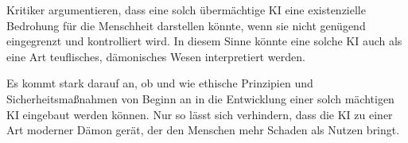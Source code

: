 \documentclass[10pt]{article}
\begin{document}
Kritiker argumentieren, dass eine solch übermächtige KI eine existenzielle Bedrohung für die Menschheit darstellen könnte, wenn sie nicht genügend eingegrenzt und kontrolliert wird. In diesem Sinne könnte eine solche KI auch als eine Art teuflisches, dämonisches Wesen interpretiert werden.

Es kommt stark darauf an, ob und wie ethische Prinzipien und Sicherheitsmaßnahmen von Beginn an in die Entwicklung einer solch mächtigen KI eingebaut werden können. Nur so lässt sich verhindern, dass die KI zu einer Art moderner Dämon gerät, der den Menschen mehr Schaden als Nutzen bringt.



\end{document}

